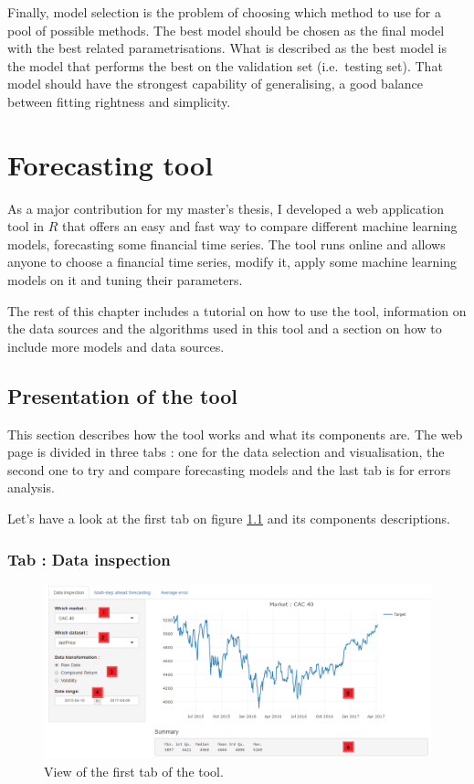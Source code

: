 \documentclass[11pt,a4paper,oneside]{book}
\begin{document}
Finally, model selection is the problem of choosing which method to use for a pool of possible methods. The best model should be chosen as the final model with the best related parametrisations. What is described as the best model is the model that performs the best on the validation set (i.e.\ testing set). That model should have the strongest capability of generalising, a good balance between fitting rightness and simplicity. \cite{BenTaieb}





\chapter{Forecasting tool}\label{tool}

As a major contribution for my master's thesis, I developed a web application tool in \textbf{$R$} that offers an easy and fast way to compare different machine learning models, forecasting some financial time series. The tool runs online and allows anyone to choose a financial time series, modify it, apply some machine learning models on it and tuning their parameters. 

The rest of this chapter includes a tutorial on how to use the tool, information on the data sources and the algorithms used in this tool and a section on how to include more models and data sources. 


\section{Presentation of the tool}

This section describes how the tool works and what its components are. The web page is divided in three tabs : one for the data selection and visualisation, the second one to try and compare forecasting models and the last tab is for errors analysis. 

Let's have a look at the first tab on figure \ref{fig:tool1} and its components descriptions.

\subsection{Tab : Data inspection}


\begin{figure}[!h]
  \centering
    \includegraphics[scale=0.44]{img/tab1.png}
  \caption{View of the first tab of the tool.}
  \label{fig:tool1}
\end{figure}
\end{document}
